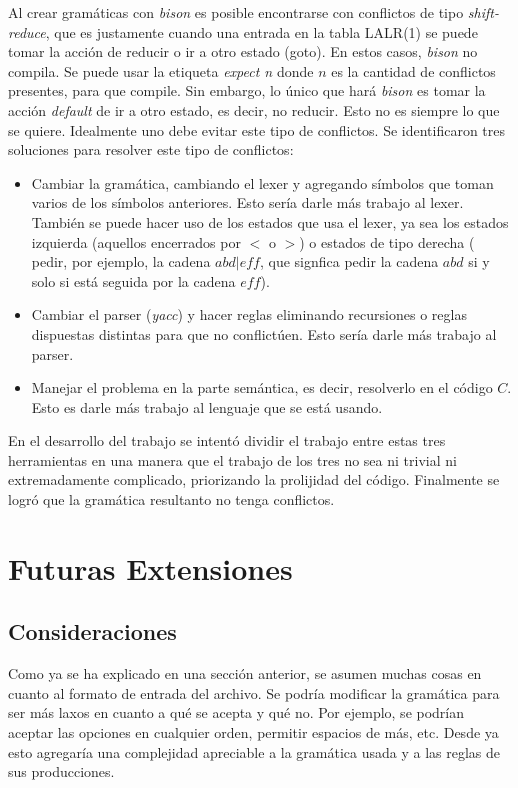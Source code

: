 \documentclass[a4paper,10pt]{article}
\begin{document}
Al crear gramáticas con \textit{bison}  es posible encontrarse con conflictos de tipo \textit{shift-reduce}, que es justamente cuando una entrada 
en la tabla LALR(1) se puede tomar la acción de reducir o ir a otro estado (goto). En estos casos, \textit{bison} no compila. Se puede usar la 
etiqueta \textit{expect n} donde $n$ es la cantidad de conflictos presentes, para que compile. Sin embargo, lo único que hará \textit{bison} es tomar 
la acción \textit{default}  de ir a otro estado, es decir, no reducir. Esto no es siempre lo que se quiere. Idealmente uno debe evitar este tipo de 
conflictos. Se identificaron tres soluciones para resolver este tipo de conflictos:
\begin{itemize}
\item Cambiar la gramática, cambiando el lexer y agregando símbolos que toman varios de los símbolos anteriores. Esto sería darle más trabajo al lexer.
También  se puede hacer uso de los estados que usa el lexer, ya sea los estados izquierda (aquellos encerrados por $<$ o $>$) o estados de tipo derecha (
pedir, por ejemplo, la cadena $abd|eff$, que signfica pedir la cadena $abd$ si y solo si está seguida por la cadena $eff$). 
\item Cambiar el parser (\textit{yacc}) y hacer reglas eliminando recursiones  o reglas dispuestas distintas para que no conflictúen. Esto sería darle 
más trabajo al parser.
\item Manejar el problema en la parte semántica, es decir, resolverlo en el código $C$. Esto es darle más trabajo al lenguaje que se está usando.
\end{itemize}

En el desarrollo del trabajo se intentó dividir el trabajo entre estas tres herramientas en una manera que el trabajo de los tres no sea ni trivial ni 
extremadamente complicado, priorizando la prolijidad del código. Finalmente se logró que la gramática resultanto no tenga conflictos.


\newpage

\section{Futuras Extensiones}

\subsection{ Consideraciones }

Como ya se ha explicado en una sección anterior, se asumen muchas cosas en cuanto al formato de entrada del archivo. Se podría modificar la gramática para 
ser más laxos en cuanto a qué se acepta y qué no. Por ejemplo, se podrían aceptar las opciones en cualquier orden, permitir espacios de más, etc. Desde ya 
esto agregaría una complejidad apreciable a la gramática usada y a las reglas de sus producciones.
\end{document}
